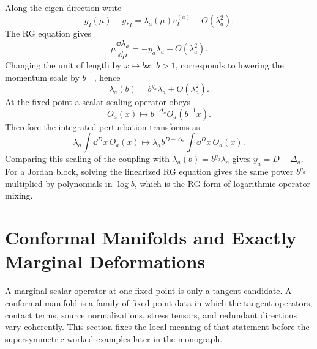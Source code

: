 Along the eigen-direction write
\[
  g_I(\mu)-g_{\ast I}=\lambda_a(\mu)v^{(a)}_I+O(\lambda_a^2).
\]
The RG equation gives
\[
  \mu\frac{\dd\lambda_a}{\dd\mu}
  =
  -y_a\lambda_a+O(\lambda_a^2).
\]
Changing the unit of length by \(x\mapsto bx\), \(b>1\), corresponds to
lowering the momentum scale by \(b^{-1}\), hence
\[
  \lambda_a(b)=b^{y_a}\lambda_a+O(\lambda_a^2).
\]
At the fixed point a scalar scaling operator obeys
\[
  O_a(x)\mapsto b^{-\Delta_a}O_a(b^{-1}x).
\]
Therefore the integrated perturbation transforms as
\[
  \lambda_a\int\dd^D x\,O_a(x)
  \mapsto
  \lambda_a b^{D-\Delta_a}
  \int\dd^D x\,O_a(x).
\]
Comparing this scaling of the coupling with
\(\lambda_a(b)=b^{y_a}\lambda_a\) gives \(y_a=D-\Delta_a\).  For a Jordan
block, solving the linearized RG equation gives the same power \(b^{y_a}\)
multiplied by polynomials in \(\log b\), which is the RG form of logarithmic
operator mixing.

\section{Conformal Manifolds and Exactly Marginal Deformations}
\label{sec:conformal-manifolds-exactly-marginal}

A marginal scalar operator at one fixed point is only a tangent candidate.  A
conformal manifold is a family of fixed-point data in which the tangent
operators, contact terms, source normalizations, stress tensors, and redundant
directions vary coherently.  This section fixes the local meaning of that
statement before the supersymmetric worked examples later in the monograph.


